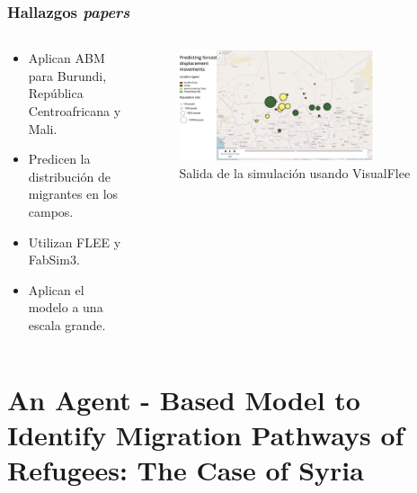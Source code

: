 \documentclass[17pt, t, lualatex]{beamer}
\begin{document}
\begin{frame}[allowframebreaks]
  \frametitle{Hallazgos \textit{papers}}
  
  \begin{columns}
    \begin{column}{.5\textwidth}
      \begin{itemize}
        \item Aplican ABM para Burundi, República Centroafricana y Mali.
        \item Predicen la distribución de migrantes en los campos.
        \item Utilizan FLEE\cite{groen_flee_2023} y
              FabSim3\cite{groen_fabsim3_2023}.
        \item Aplican el modelo a una escala grande.
      \end{itemize}
    \end{column}

    \begin{column}{.5\textwidth}
      \begin{figure}[ht]
        \centering
        \includegraphics[width=0.8\textwidth]{img/Paper2Fig1.png}
        \caption{\label{fig:p1f1} Salida de la simulación usando VisualFlee\cite{Visualflee,suleimenova2020predicting}}
      \end{figure}

    \end{column}
  \end{columns}

\end{frame}



\section{An Agent - Based Model to Identify Migration Pathways of Refugees: The
  Case of Syria}

\insertsectionpage
\end{document}
